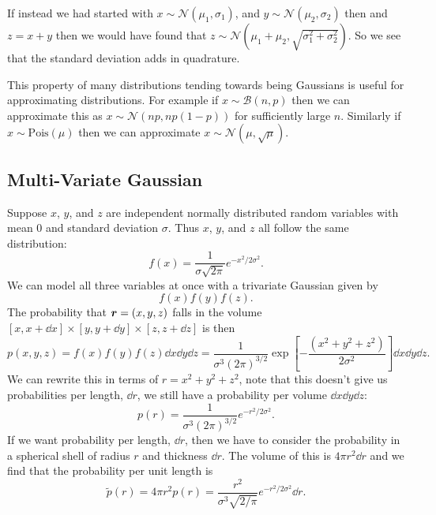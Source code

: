 \documentclass[a4paper]{article}
\newcommand{\distributed}{\sim}
\newcommand{\normal}{\mathcal{N}}
\newcommand{\binomial}{\mathcal{B}}
\newcommand{\poisson}{\mathrm{Pois}}
\begin{document}
    If instead we had started with \(x\distributed\normal(\mu_1, \sigma_1)\), and \(y\distributed\normal(\mu_2, \sigma_2)\) then and \(z = x + y\) then we would have found that \(z\distributed\normal(\mu_1 + \mu_2, \sqrt{\sigma_1^2 + \sigma_2^2})\).
    So we see that the standard deviation adds in quadrature.
    
    This property of many distributions tending towards being Gaussians is useful for approximating distributions.
    For example if \(x\distributed\binomial(n, p)\) then we can approximate this as \(x\distributed\normal(np, np(1-p))\) for sufficiently large \(n\).
    Similarly if \(x\distributed\poisson(\mu)\) then we can approximate \(x\distributed\normal(\mu, \sqrt{\mu})\).
    
    \subsection{Multi-Variate Gaussian}
    Suppose \(x\), \(y\), and \(z\) are independent normally distributed random variables with mean 0 and standard deviation \(\sigma\).
    Thus \(x\), \(y\), and \(z\) all follow the same distribution:
    \[f(x) = \frac{1}{\sigma\sqrt{2\pi}}e^{-x^2/2\sigma^2}.\]
    We can model all three variables at once with a trivariate Gaussian given by
    \[f(x)f(y)f(z).\]
    The probability that \(\bm{r} = (x, y, z)\) falls in the volume \([x, x + \dd{x}]\times [y, y + \dd{y}]\times [z, z + \dd{z}]\) is then
    \[p(x, y, z) = f(x)f(y)f(z)\dd{x}\dd{y}\dd{z} = \frac{1}{\sigma^3(2\pi)^{3/2}}\exp\left[ -\frac{(x^2 + y^2 + z^2)}{2\sigma^2} \right]\dd{x}\dd{y}\dd{z}.\]
    We can rewrite this in terms of \(r = x^2 + y^2 + z^2\), note that this doesn't give us probabilities per length, \(\dd{r}\), we still have a probability per volume \(\dd{x}\dd{y}\dd{z}\):
    \[p(r) = \frac{1}{\sigma^3(2\pi)^{3/2}}e^{-r^2/2\sigma^2}.\]
    If we want probability per length, \(\dd{r}\), then we have to consider the probability in a spherical shell of radius \(r\) and thickness \(\dd{r}\).
    The volume of this is \(4\pi r^2\dd{r}\) and we find that the probability per unit length is
    \[\tilde{p}(r) = 4\pi r^2p(r) = \frac{r^2}{\sigma^3\sqrt{2/\pi}}e^{-r^2/2\sigma^2}\dd{r}.\]
    
\end{document}
